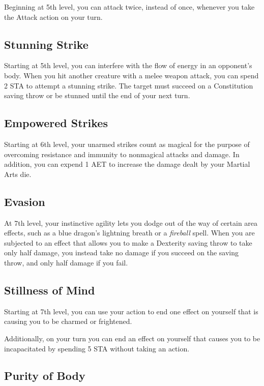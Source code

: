 Beginning at 5th level, you can attack twice, instead of once, whenever you take the Attack action on your turn.

\subsection{Stunning Strike}

Starting at 5th level, you can interfere with the flow of energy in an opponent's body. When you hit another creature with a melee weapon attack, you can spend 2 STA to attempt a stunning strike. The target must succeed on a Constitution saving throw or be stunned until the end of your next turn.

\subsection{Empowered Strikes}

Starting at 6th level, your unarmed strikes count as magical for the purpose of overcoming resistance and immunity to nonmagical attacks and damage. In addition, you can expend 1 AET to increase the damage dealt by your Martial Arts die.

\subsection{Evasion}

At 7th level, your instinctive agility lets you dodge out of the way of certain area effects, such as a blue dragon's lightning breath or a \textit{fireball} spell. When you are subjected to an effect that allows you to make a Dexterity saving throw to take only half damage, you instead take no damage if you succeed on the saving throw, and only half damage if you fail.

\subsection{Stillness of Mind}

Starting at 7th level, you can use your action to end one effect on yourself that is causing you to be charmed or frightened.

Additionally, on your turn you can end an effect on yourself that causes you to be incapacitated by spending 5 STA without taking an action.

\subsection{Purity of Body}

